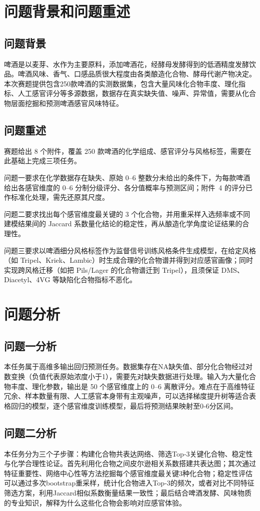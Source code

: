 \documentclass[12pt,a4paper]{article}
\begin{document}
\section{问题背景和问题重述}
\subsection{问题背景}
啤酒是以麦芽、水作为主要原料，添加啤酒花，经酵母发酵得到的低酒精度发酵饮品。啤酒风味、香气、口感品质很大程度由各类酿造化合物、酵母代谢产物决定。本次赛题提供包含250款啤酒的实测数据集，包含大量风味化合物丰度、理化指标、人工感官评分等多源数据，数据存在真实缺失值、噪声、异常值，需要从化合物层面挖掘和预测啤酒感官风味特征。

\subsection{问题重述}
赛题给出 8 个附件，覆盖 250 款啤酒的化学组成、感官评分与风格标签，需要在此基础上完成三项任务。

问题一要求在化学数据存在缺失、原始 0--6 整数分未给出的条件下，为每款啤酒给出各感官维度的 0--6 分制分级评分、各分值概率与预测区间；附件~4 的评分已作标准化处理，需先还原其尺度。

问题二要求找出每个感官维度最关键的 3 个化合物，并用重采样入选频率或不同建模结果间的 Jaccard 系数量化结论的稳定性，再从酿造化学角度论证结果的合理性。

问题三要求以啤酒细分风格标签作为监督信号训练风格条件生成模型，在给定风格（如 Tripel、Kriek、Lambic）时生成合理的化合物谱并得到对应感官画像；同时实现跨风格迁移（如把 Pils/Lager 的化合物谱迁到 Tripel），且须保证 DMS、Diacetyl、4VG 等缺陷化合物指标不恶化。
\section{问题分析}
\subsection{问题一分析}
本任务属于高维多输出回归预测任务。数据集存在NA缺失值、部分化合物经过对数变换（负值代表原始浓度小于1），需要先对缺失数据进行处理。输入为大量化合物丰度、理化参数，输出是 50 个感官维度上的 0--6 离散评分。难点在于高维特征冗余、样本数量有限、人工感官本身带有主观噪声，可以选择梯度提升树等适合表格回归的模型，逐个感官维度训练模型，最后将预测结果映射至0‑6分区间。

\subsection{问题二分析}
本任务分为三个子步骤：构建化合物共表达网络、筛选Top‑3关键化合物、稳定性与化学合理性论证。首先利用化合物之间皮尔逊相关系数搭建共表达图；其次通过特征重要性、网络中心性等方法挖掘每个感官维度最关键3种化合物；稳定性评估可以通过多次bootstrap重采样，统计化合物进入Top‑3的频次，或者对比不同特征筛选方案，利用Jaccard相似系数衡量结果一致性；最后结合啤酒发酵、风味物质的专业知识，解释为什么这些化合物会影响对应感官体验。
\end{document}
